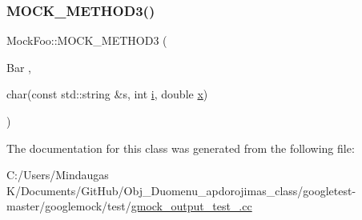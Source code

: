 \subsubsection{\texorpdfstring{MOCK\_METHOD3()}{MOCK\_METHOD3()}\hspace{0.1cm}{\footnotesize\ttfamily [3/3]}}
{\footnotesize\ttfamily Mock\+Foo\+::\+M\+O\+C\+K\+\_\+\+M\+E\+T\+H\+O\+D3 (\begin{DoxyParamCaption}\item[{Bar}]{,  }\item[{char(const std\+::string \&s, int \mbox{\hyperlink{_obj__test_2lib_2googletest-master_2googlemock_2test_2gmock-matchers__test_8cc_acb559820d9ca11295b4500f179ef6392}{i}}, double \mbox{\hyperlink{_obj__test_2lib_2googletest-master_2googlemock_2test_2gmock-matchers__test_8cc_a6150e0515f7202e2fb518f7206ed97dc}{x}})}]{ }\end{DoxyParamCaption})}



The documentation for this class was generated from the following file\+:\begin{DoxyCompactItemize}
\item 
C\+:/\+Users/\+Mindaugas K/\+Documents/\+Git\+Hub/\+Obj\+\_\+\+Duomenu\+\_\+apdorojimas\+\_\+class/googletest-\/master/googlemock/test/\mbox{\hyperlink{googletest-master_2googlemock_2test_2gmock__output__test___8cc}{gmock\+\_\+output\+\_\+test\+\_\+.\+cc}}\end{DoxyCompactItemize}
